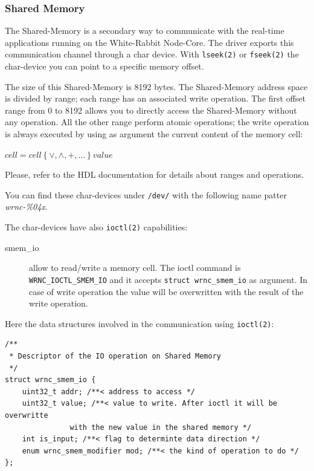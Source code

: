 \documentclass[a4paper,10pt]{article}
\begin{document}
\subsubsection{Shared Memory}%
The Shared-Memory is a secondary way to communicate with the real-time
applications running on the White-Rabbit Node-Core. The driver exports
this communication channel through a char device. With \texttt{lseek(2)}
or \texttt{fseek(2)} the char-device you can point to a specific
memory offset.

The size of this Shared-Memory is 8192 bytes. The Shared-Memory
address space is divided by range; each range has an associated write
operation. The first offset range from 0 to 8192 allows you to
directly access the Shared-Memory without any operation. All the other
range perform atomic operations; the write operation is always
executed by using as argument the current content of the memory cell:

\begin{math}
  cell = cell \left\{ \vee, \wedge, +, \dots \right\} value
\end{math}

Please, refer to the HDL documentation for details about ranges
and operations.

You can find these char-devices under \texttt{/dev/} with the
following name patter \textit{wrnc-\%04x}.

The char-devices have also \texttt{ioctl(2)} capabilities:
\begin{description}
  \item[smem\_io] allow to read/write a memory cell. The ioctl command
    is \texttt{WRNC\_IOCTL\_SMEM\_IO} and it accepts \texttt{struct
    wrnc\_smem\_io} as argument. In case of write operation the
    value will be overwritten with the result of the write operation.
\end{description}

Here the data structures involved in the communication using
\texttt{ioctl(2)}:

\begin{lstlisting}
/**
 * Descriptor of the IO operation on Shared Memory
 */
struct wrnc_smem_io {
	uint32_t addr; /**< address to access */
	uint32_t value; /**< value to write. After ioctl it will be overwritte
			   with the new value in the shared memory */
	int is_input; /**< flag to determinte data direction */
	enum wrnc_smem_modifier mod; /**< the kind of operation to do */
};
\end{lstlisting}
\end{document}
